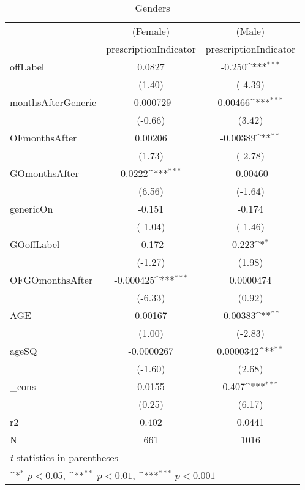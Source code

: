 \begin{table}[htbp]\centering
\def\sym#1{\ifmmode^{#1}\else\(^{#1}\)\fi}
\caption{Genders\label{tab1}}
\begin{tabular}{l*{2}{c}}
\hline\hline
            &\multicolumn{1}{c}{(Female)}&\multicolumn{1}{c}{(Male)}\\
            &\multicolumn{1}{c}{prescriptionIndicator}&\multicolumn{1}{c}{prescriptionIndicator}\\
\hline
offLabel    &      0.0827         &      -0.250\sym{***}\\
            &      (1.40)         &     (-4.39)         \\
[1em]
monthsAfterGeneric&   -0.000729         &     0.00466\sym{***}\\
            &     (-0.66)         &      (3.42)         \\
[1em]
OFmonthsAfter&     0.00206         &    -0.00389\sym{**} \\
            &      (1.73)         &     (-2.78)         \\
[1em]
GOmonthsAfter&      0.0222\sym{***}&    -0.00460         \\
            &      (6.56)         &     (-1.64)         \\
[1em]
genericOn   &      -0.151         &      -0.174         \\
            &     (-1.04)         &     (-1.46)         \\
[1em]
GOoffLabel  &      -0.172         &       0.223\sym{*}  \\
            &     (-1.27)         &      (1.98)         \\
[1em]
OFGOmonthsAfter&   -0.000425\sym{***}&   0.0000474         \\
            &     (-6.33)         &      (0.92)         \\
[1em]
AGE         &     0.00167         &    -0.00383\sym{**} \\
            &      (1.00)         &     (-2.83)         \\
[1em]
ageSQ       &  -0.0000267         &   0.0000342\sym{**} \\
            &     (-1.60)         &      (2.68)         \\
[1em]
\_cons      &      0.0155         &       0.407\sym{***}\\
            &      (0.25)         &      (6.17)         \\
\hline
r2          &       0.402         &      0.0441         \\
N           &         661         &        1016         \\
\hline\hline
\multicolumn{3}{l}{\footnotesize \textit{t} statistics in parentheses}\\
\multicolumn{3}{l}{\footnotesize \sym{*} \(p<0.05\), \sym{**} \(p<0.01\), \sym{***} \(p<0.001\)}\\
\end{tabular}
\end{table}
